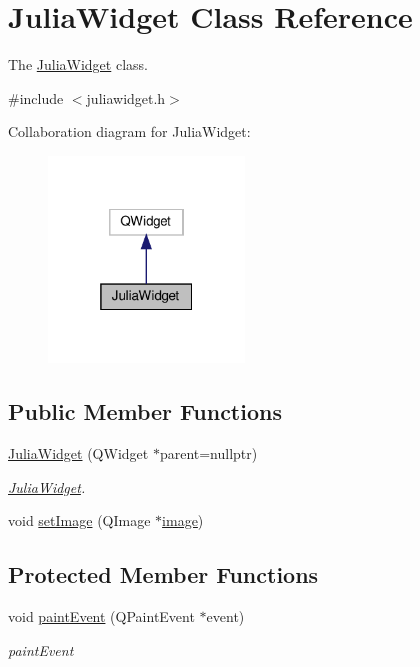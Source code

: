 \hypertarget{classJuliaWidget}{}\section{Julia\+Widget Class Reference}
\label{classJuliaWidget}


The \hyperlink{classJuliaWidget}{Julia\+Widget} class.  




{\ttfamily \#include $<$juliawidget.\+h$>$}



Collaboration diagram for Julia\+Widget\+:\nopagebreak
\begin{figure}[H]
\begin{center}
\leavevmode
\includegraphics[width=148pt]{classJuliaWidget__coll__graph}
\end{center}
\end{figure}
\subsection*{Public Member Functions}
\begin{DoxyCompactItemize}
\item 
\hyperlink{classJuliaWidget_a43281a37bd560567372d1f9ccfd673c5}{Julia\+Widget} (Q\+Widget $\ast$parent=nullptr)
\begin{DoxyCompactList}\small\item\em \hyperlink{classJuliaWidget}{Julia\+Widget}. \end{DoxyCompactList}\item 
void \hyperlink{classJuliaWidget_a686d58acadb8eaa396ca6904318a5547}{set\+Image} (Q\+Image $\ast$\hyperlink{classJuliaWidget_abc96ffcb51d90cc16ed92242fdb62d1b}{image})
\end{DoxyCompactItemize}
\subsection*{Protected Member Functions}
\begin{DoxyCompactItemize}
\item 
void \hyperlink{classJuliaWidget_a65d06d3f69873f573380fde577abfcf2}{paint\+Event} (Q\+Paint\+Event $\ast$event)
\begin{DoxyCompactList}\small\item\em paint\+Event \end{DoxyCompactList}\end{DoxyCompactItemize}
